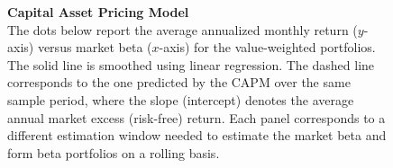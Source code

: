 \begin{figure}[!ht] 
 \caption{\color{black} \textbf{Capital Asset Pricing Model} \\ The dots below report the average annualized monthly return  ($y$-axis) versus market beta   ($x$-axis) for the value-weighted portfolios. The solid line is smoothed using linear regression. The dashed line corresponds to the one predicted by the CAPM over the same sample period, where the slope (intercept) denotes the average annual market excess (risk-free) return. Each panel corresponds to a different estimation window needed to estimate the market beta and form beta portfolios on a rolling basis.}
\label{fig:sim} 
 \begin{center} 
 \end{center}
 
 \vspace{-0.25in}
\end{figure}





